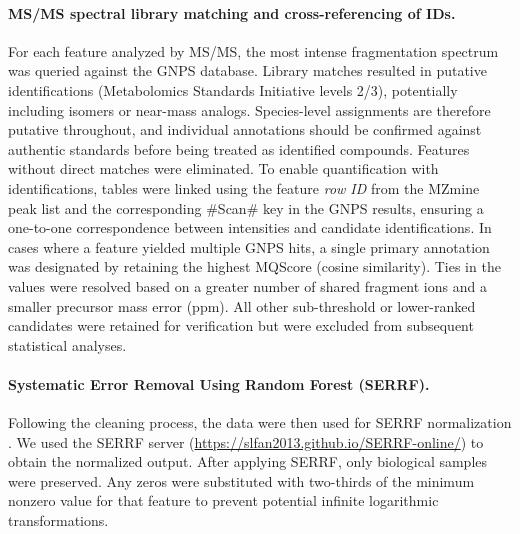 \documentclass[9pt,twocolumn,twoside]{rilabRxiv}
\begin{document}
\paragraph{MS/MS spectral library matching and cross-referencing of IDs.}
For each feature analyzed by MS/MS, the most intense fragmentation spectrum was queried against the GNPS database. Library matches resulted in putative identifications (Metabolomics Standards Initiative levels 2/3), potentially including isomers or near-mass analogs. Species-level assignments are therefore putative throughout, and individual annotations should be confirmed against authentic standards before being treated as identified compounds. Features without direct matches were eliminated. To enable quantification with identifications, tables were linked using the feature \emph{row ID} from the MZmine peak list and the corresponding \#Scan\# key in the GNPS results, ensuring a one-to-one correspondence between intensities and candidate identifications. In cases where a feature yielded multiple GNPS hits, a single primary annotation was designated by retaining the highest MQScore (cosine similarity). Ties in the values were resolved based on a greater number of shared fragment ions and a smaller precursor mass error (ppm). All other sub-threshold or lower-ranked candidates were retained for verification but were excluded from subsequent statistical analyses.

\paragraph{Systematic Error Removal Using Random Forest (SERRF).}
Following the cleaning process, the data were then used for SERRF normalization \citep{Fan2019}. We used the SERRF server (\url{https://slfan2013.github.io/SERRF-online/}) to obtain the normalized output. After applying SERRF, only biological samples were preserved. Any zeros were substituted with two-thirds of the minimum nonzero value for that feature to prevent potential infinite logarithmic transformations.
\end{document}
